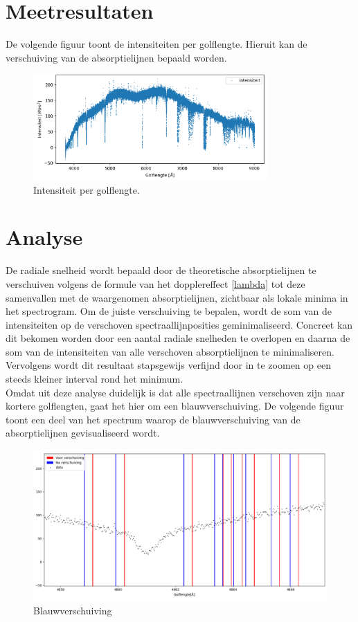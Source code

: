 \documentclass[12pt]{article}
\begin{document}
	\section{Meetresultaten}
De volgende figuur toont de intensiteiten per golflengte. Hieruit kan de verschuiving van de absorptielijnen bepaald worden.
\begin{figure}[h]
   	\centering
    	\includegraphics[width=0.8\textwidth]{intensiteit per golflengte.png}
    	\caption{Intensiteit per golflengte.}
    	\label{fig 3:Intensiteit per golflengte.}
\end{figure}


\newpage
	\section{Analyse}
	De radiale snelheid wordt bepaald door de theoretische absorptielijnen te verschuiven volgens de formule van het dopplereffect \eqref{lambda} tot deze samenvallen met de waargenomen absorptielijnen, zichtbaar als lokale minima in het spectrogram. Om de juiste verschuiving te bepalen, wordt de som van de intensiteiten op de verschoven spectraallijnposities geminimaliseerd. Concreet kan dit bekomen worden door een aantal radiale snelheden te overlopen en daarna de som van de intensiteiten van alle verschoven absorptielijnen te minimaliseren. Vervolgens wordt dit resultaat stapsgewijs verfijnd door in te zoomen op een steeds kleiner interval rond het minimum.\\
	Omdat uit deze analyse duidelijk is dat alle spectraallijnen verschoven zijn naar kortere golflengten, gaat het hier om een blauwverschuiving.
	De volgende figuur toont een deel van het spectrum waarop de blauwverschuiving van de absorptielijnen gevisualiseerd wordt.
	\\ 
	\begin{figure}[h]
	   	\centering
	    	\includegraphics[width=1\textwidth]{shift.png}
	    	\caption{Blauwverschuiving}
	    	\label{fig 5:shift}
	\end{figure}
	
\end{document}
